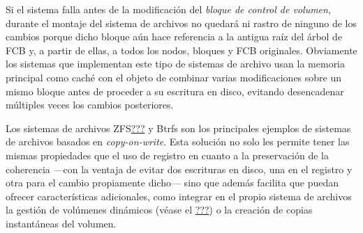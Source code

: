 Si el sistema falla antes de la modificación del \emph{bloque de control
de volumen}, durante el montaje del sistema de archivos no quedará ni
rastro de ninguno de los cambios porque dicho bloque aún hace referencia
a la antigua raíz del árbol de FCB y, a partir de ellas, a todos los
nodos, bloques y FCB originales. Obviamente los sistemas que implementan
este tipo de sistemas de archivo usan la memoria principal como caché
con el objeto de combinar varias modificaciones sobre un mismo bloque
antes de proceder a su escritura en disco, evitando desencadenar
múltiples veces los cambios posteriores.

Los sistemas de archivos ZFS\hyperref[Sun2006]{???} y Btrfs son los
principales ejemplos de sistemas de archivos basados en
\emph{copy-on-write}. Esta solución no solo les permite tener las mismas
propiedades que el uso de registro en cuanto a la preservación de la
coherencia ---con la ventaja de evitar dos escrituras en disco, una en
el registro y otra para el cambio propiamente dicho--- sino que además
facilita que puedan ofrecer características adicionales, como integrar
en el propio sistema de archivos la gestión de volúmenes dinámicos
(véase el \hyperref[_voluxfamenes_dinuxe1micos]{???}) o la creación de
copias instantáneas del volumen.
